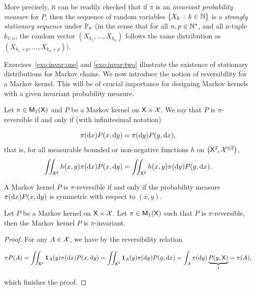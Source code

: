 \documentclass[english,graybox,envcountchap,envcountsame,sectrefs,shortlabels]{svmono}
\theoremstyle{style}
\newenvironment{svmultproof}{\small \begin{proof}}{\end{proof}}
\newcommand{\bs}{\begin{shaded}}
\newcommand{\es}{\end{shaded}}
\begin{document}
More precisely, it can be readily checked that if $\pi$ is an \emph{invariant
probability measure }for $P$, then the sequence of random variables
$\left\{ X_{k}\,:\,k\in\mathbb{N}\right\}$ is a \emph{strongly stationary sequence}
under $\mathbb{P}_{\pi}$ (in the sense that for all $n,p\in\mathbb{N}^{*}$,
and all n-tuple $k_{1:n}$, the random vector $(X_{k_{1}},\ldots,X_{k_{n}})$
follows the same distribution as $(X_{k_{1}+p},\ldots,X_{k_{n}+p}))$.

Exercises~\ref{exo:invar:one} and \ref{exo:invar:two} illustrate the existence of stationary distributions for Markov chains.
We now introduce the notion of reversibility for a Markov kernel.
This will be of crucial importance for designing Markov kernels with
a given invariant probability measure.

\bs
\begin{definition}
Let $\pi\in\mathsf{M}_{1}(\mathsf{X})$ and $P$ be a Markov kernel on $\mathsf{X}\times\mathcal{X}$.
We say that $P$ is $\pi$-reversible if and only if (with infinitesimal
notation)

\begin{equation}
\pi(\mathrm{d} x)P(x,\mathrm{d} y)=\pi(\mathrm{d} y)P(y,\mathrm{d} x),\label{eq:reversibility}
\end{equation}
that is, for all measurable bounded or non-negative functions $h$
on $\left(\mathsf{X}^{2},\mathcal{X}^{\otimes2}\right)$,
\begin{equation}
\iint_{\mathsf{X}^{2}}h(x,y)\pi(\mathrm{d} x)P(x,\mathrm{d} y)=\iint_{\mathsf{X}^{2}}h(x,y)\pi(\mathrm{d} y)P(y,\mathrm{d} x).\label{eq:reversibility:h}
\end{equation}
\end{definition}
\es A Markov kernel $P$ is $\pi$-reversible if and only
if the probability measure $\pi(\mathrm{d} x)P(x,\mathrm{d} y)$ is symmetric
with respect to $(x,y)$. \bs
\begin{proposition}
Let $P$ be a Markov kernel on $\mathsf{X}\times\mathcal{X}$. Let $\pi\in\mathsf{M}_{1}(\mathsf{X})$
such that $P$ is $\pi$-reversible, then the Markov kernel $P$ is
$\pi$-invariant.
\end{proposition}
\es
\begin{svmultproof}
For any $A\in\mathcal{X}$, we have by the reversibility relation

\[
\pi P(A)=\iint_{\mathsf{X}^{2}}\mathbf{1}_{A}(y)\pi(\mathrm{d} x)P(x,\mathrm{d} y)=\iint_{\mathsf{X}^{2}}\mathbf{1}_{A}(y)\pi(\mathrm{d} y)P(y,\mathrm{d} x)=\int_{A}\pi(\mathrm{d} y)\underbrace{P(y,\mathsf{X})}_{1}=\pi(A),
\]

which finishes the proof.
\end{svmultproof}
\end{document}
